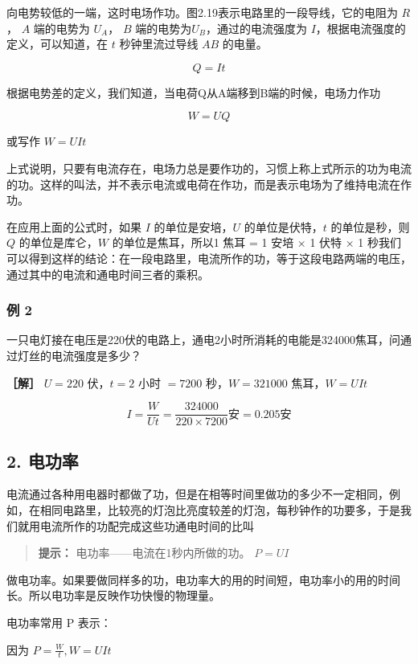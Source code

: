 向电势较低的一端，这时电场作功。图2.19表示电路里的一段导线，它的电阻为
\(R\)， \(A\) 端的电势为 \(U_{A}\)， \(B\)
端的电势为\(U_{B}\)，通过的电流强度为
\(I\)，根据电流强度的定义，可以知道，在 \(t\) 秒钟里流过导线 \(AB\)
的电量。

\[
Q = I t
\]

根据电势差的定义，我们知道，当电荷Q从A端移到B端的时候，电场力作功

\[
W = U Q
\]

或写作 \(W = UIt\)

上式说明，只要有电流存在，电场力总是要作功的，习惯上称上式所示的功为电流的功。这样的叫法，并不表示电流或电荷在作功，而是表示电场为了维持电流在作功。

在应用上面的公式时，如果 \(I\) 的单位是安培，\(U\) 的单位是伏特，\(t\)
的单位是秒，则 \(Q\) 的单位是库仑，\(W\) 的单位是焦耳，所以1 焦耳 = 1
安培 × 1 伏特 × 1
秒我们可以得到这样的结论：在一段电路里，电流所作的功，等于这段电路两端的电压，通过其中的电流和通电时间三者的乘积。

\subsubsection{例 2}\label{ux4f8b-2-1}

一只电灯接在电压是220伏的电路上，通电2小时所消耗的电能是324000焦耳，问通过灯丝的电流强度是多少？

\textbf{［解］} \(U = 220\) 伏，\(t = 2\) 小时 \(= 7200\)
秒，\(W = 321000\) 焦耳，\(W=UIt\)

\[
I = \frac{W}{U t} = \frac{324000}{220\times7200} \text{安} = 0.205 \text{安}
\]

\subsection{2. 电功率}\label{ux7535ux529fux7387}

电流通过各种用电器时都做了功，但是在相等时间里做功的多少不一定相同，例如，在相同电路里，比较亮的灯泡比亮度较差的灯泡，每秒钟作的功要多，于是我们就用电流所作的功配完成这些功通电时间的比叫

\begin{quote}
\textbf{提示：} 电功率------电流在1秒内所做的功。 \(P = UI\)
\end{quote}

做电功率。如果要做同样多的功，电功率大的用的时间短，电功率小的用的时间长。所以电功率是反映作功快慢的物理量。

电功率常用 P 表示：

因为 \(P = \frac{W}{t}, W = UIt\)

